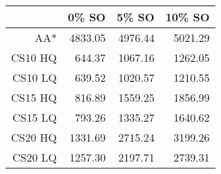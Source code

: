\begin{table}[ht]
\begin{center}
\begin{tabular}{rrrr}
  \hline
 & 0\% SO & 5\% SO & 10\% SO \\
  \hline
AA* & 4833.05 & 4976.44 & 5021.29 \\
  CS10 HQ & 644.37 & 1067.16 & 1262.05 \\
  CS10 LQ & 639.52 & 1020.57 & 1210.55 \\
  CS15 HQ & 816.89 & 1559.25 & 1856.99 \\
  CS15 LQ & 793.26 & 1335.27 & 1640.62 \\
  CS20 HQ & 1331.69 & 2715.24 & 3199.26 \\
  CS20 LQ & 1257.30 & 2197.71 & 2739.31 \\
   \hline
\end{tabular}
\end{center}
\end{table}

